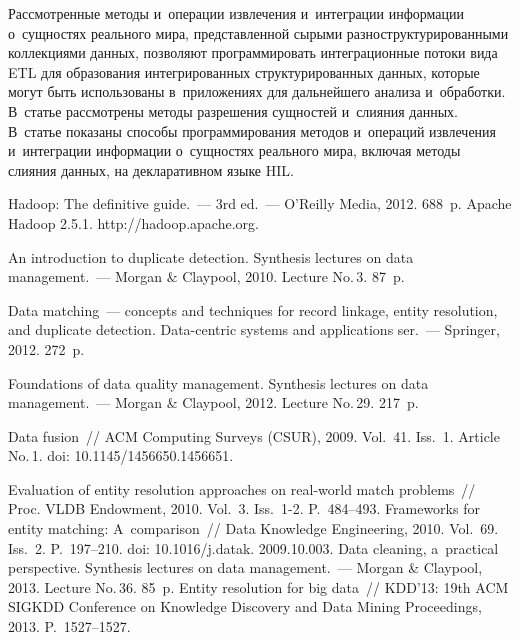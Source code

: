\begin{multicols}{2}
  Рассмотренные методы и~операции извлечения и~интеграции информации о~сущностях
реального мира, представленной сырыми разноструктурированными коллекциями данных,
позволяют программировать интеграционные потоки вида ETL для образования
интегрированных структурированных данных, которые могут быть использованы
в~приложениях для дальнейшего анализа и~обработки. В~статье рассмотрены методы
разрешения сущностей и~слияния данных. В~статье показаны способы программирования
методов и~операций извлечения и~интеграции информации о~сущностях реального мира,
включая методы слияния данных, на декларативном языке HIL.


{\small\frenchspacing
 {%
 \begin{thebibliography}{99}
 Hadoop: The definitive guide.~--- 3rd ed.~--- O'Reilly Media, 2012.
688~p.
Apache Hadoop 2.5.1. {\sf http://hadoop.apache.org}.

 An introduction to duplicate detection.
Synthesis lectures on
data management.~--- Morgan \& Claypool, 2010. Lecture No.\,3. 87~p.

 Data matching~---  concepts and techniques for record linkage, entity
resolution, and duplicate detection. Data-centric systems and applications
ser.~--- Springer, 2012. 272~p.

 Foundations of data quality management. Synthesis lectures on data
management.~--- Morgan \& Claypool, 2012. Lecture No.\,29. 217~p.


 Data fusion~// ACM Computing Surveys (CSUR), 2009.
Vol.~41. Iss.~1. Article No.\,1. doi: 10.1145/1456650.1456651.


 Evaluation of entity resolution approaches
on real-world match problems~// Proc. VLDB Endowment, 2010. Vol.~3. Iss.~1-2.
P.~484--493.
 Frameworks for entity matching: A~comparison~//
Data Knowledge Engineering, 2010. Vol.~69. Iss.~2. P.~197--210.
doi: 10.1016/j.datak. 2009.10.003.
 Data cleaning, a~practical perspective. Synthesis lectures on
data management.~--- Morgan \& Claypool, 2013. Lecture No.\,36. 85~p.
 Entity resolution for big data~// KDD'13: 19th ACM
SIGKDD Conference on Knowledge Discovery and Data Mining Proceedings, 2013.
P.~1527--1527.


\end{thebibliography}}}
\end{multicols}
